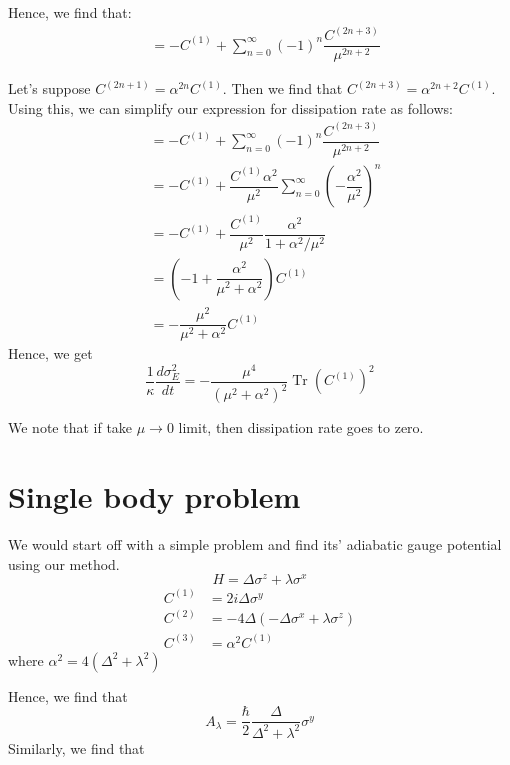 \documentclass[11pt,a4paper]{article}
\DeclareMathOperator{\Tr}{Tr}
\begin{document}
Hence, we find that:
\begin{align}
[G_{\lambda}(A_{\lambda} (\mu)), H] &= - C^{(1)} +  \sum_{n=0}^{\infty}   (-1)^{n}   \dfrac{ C^{(2n+3)}}{\mu^{2n+2}}
\end{align}

Let's suppose $C^{(2n+1)}= \alpha^{2n} C^{(1)}$. Then we find that $C^{(2n+3)}= \alpha^{2n+2} C^{(1)} $. Using this, we can simplify our expression for dissipation rate as follows:
\begin{align}
 [G_{\lambda}(A_{\lambda} (\mu)), H]&=  - C^{(1)} +  \sum_{n=0}^{\infty}   (-1)^{n}   \dfrac{ C^{(2n+3)}}{\mu^{2n+2}}\\
&=  - C^{(1)} +    \dfrac{ C^{(1)}\alpha^2 }{\mu^{2}} \sum_{n=0}^{\infty}   \left(  - \dfrac{ \alpha^{2} }{\mu^{2}}\right)^n \\
&=  - C^{(1)} +    \dfrac{ C^{(1)} }{\mu^{2}} \dfrac{ \alpha^2  }{1 + \alpha^2 / \mu^{2}} \\
&= \left(- 1 +    \dfrac{\alpha^2  }{   \mu^{2}+ \alpha^2 } \right) C^{(1)} \\
&=-\dfrac{\mu^{2} }{   \mu^{2}+ \alpha^2 }  C^{(1)}
\end{align}
Hence, we get 
\begin{equation}
\boxed{\dfrac{1}{ \kappa } \dfrac{d \sigma^2_E}{ dt}= -\dfrac{\mu^{4} }{   (\mu^{2}+ \alpha^2)^2 } \Tr (C^{(1)})^2}
\end{equation}

We note that if take $\mu \rightarrow 0$ limit, then dissipation rate goes to zero.



\section{Single body problem}
We would start off with a simple problem and find its' adiabatic gauge potential using our method.
\begin{equation}
H= \Delta \sigma^z + \lambda \sigma^x
\end{equation}
\begin{align}
C^{(1)} &= 2 i \Delta \sigma^y \\
C^{(2)} &= - 4  \Delta ( -  \Delta \sigma^x + \lambda \sigma^z) \\
C^{(3)} &= \alpha^2 C^{(1)} 
\end{align}
where $\alpha^2 = 4 (\Delta^2 + \lambda^2) $

Hence, we find that 
\begin{equation}
A_{\lambda}= \dfrac{\hbar}{2}\dfrac{\Delta }{\Delta^2 + \lambda^2} \sigma^y
\end{equation}
Similarly, we find that 
\end{document}
